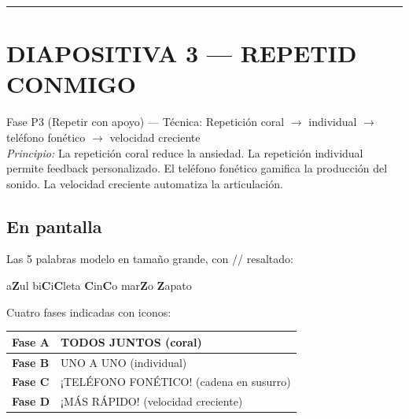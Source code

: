 \documentclass[a4paper,11pt]{article}
\begin{document}
\newpage


\noindent\textcolor{violeta}{\rule{\linewidth}{2.5pt}}

\section*{DIAPOSITIVA 3 — REPETID CONMIGO}

{\small Fase P3 (Repetir con apoyo) — Técnica: Repetición coral $\rightarrow$ individual $\rightarrow$ teléfono fonético $\rightarrow$ velocidad creciente}\\
{\small\textit{Principio:} La repetición coral reduce la ansiedad. La repetición individual permite feedback personalizado. El teléfono fonético gamifica la producción del sonido. La velocidad creciente automatiza la articulación.}

\vspace{0.5cm}

\subsection*{En pantalla}

Las 5 palabras modelo en tamaño grande, con /\texttheta/ resaltado:

\begin{center}
{\Large
a\textbf{\textcolor{rojog}{Z}}ul \quad\quad
bi\textbf{\textcolor{rojog}{C}}i\textbf{\textcolor{rojog}{C}}leta \quad\quad
\textbf{\textcolor{rojog}{C}}in\textbf{\textcolor{rojog}{C}}o \quad\quad
mar\textbf{\textcolor{rojog}{Z}}o \quad\quad
\textbf{\textcolor{rojog}{Z}}apato
}
\end{center}

\vspace{0.5cm}

Cuatro fases indicadas con iconos:

\begin{center}
\renewcommand{\arraystretch}{1.8}
\begin{tabular}{|>{\centering\arraybackslash}p{3cm}|>{\raggedright\arraybackslash}p{9cm}|}
\hline
\rowcolor{verde!15}
\textbf{Fase A} & TODOS JUNTOS (coral) \\
\hline
\textbf{Fase B} & UNO A UNO (individual) \\
\hline
\rowcolor{naranja!10}
\textbf{Fase C} & ¡TELÉFONO FONÉTICO! (cadena en susurro) \\
\hline
\textbf{Fase D} & ¡MÁS RÁPIDO! (velocidad creciente) \\
\hline
\end{tabular}
\end{center}
\end{document}
